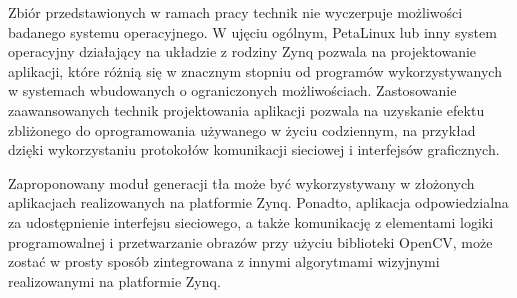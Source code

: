 Zbiór przedstawionych w ramach pracy technik nie wyczerpuje możliwości badanego systemu operacyjnego. 
W ujęciu ogólnym, PetaLinux lub inny system operacyjny działający na układzie z rodziny Zynq pozwala na projektowanie aplikacji, które różnią się w znacznym stopniu od programów wykorzystywanych w systemach wbudowanych o ograniczonych możliwościach. 
Zastosowanie zaawansowanych technik projektowania aplikacji pozwala na uzyskanie efektu zbliżonego do oprogramowania używanego w życiu codziennym, na przykład dzięki wykorzystaniu protokołów komunikacji sieciowej i interfejsów graficznych.

Zaproponowany moduł generacji tła może być wykorzystywany w złożonych aplikacjach realizowanych na platformie Zynq. Ponadto, aplikacja odpowiedzialna za udostępnienie interfejsu sieciowego, a także komunikację z elementami logiki programowalnej i przetwarzanie obrazów przy użyciu biblioteki OpenCV, może zostać w prosty sposób zintegrowana z innymi algorytmami wizyjnymi realizowanymi na platformie Zynq.


